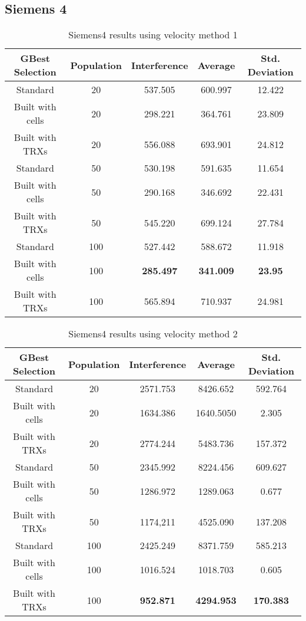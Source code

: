 \subsection{Siemens 4}
\begin{table}[H]
\centering
	\begin{tabular}{| c | c | c | c | c |}
	\hline
	GBest Selection & Population & Interference & Average & Std. Deviation\\ \hline
	Standard & 20 & 537.505 & 600.997 & 12.422\\ \hline
	Built with cells & 20 & 298.221 & 364.761 & 23.809\\ \hline
	Built with TRXs & 20 & 556.088 & 693.901 & 24.812\\ \hline
	Standard & 50 & 530.198 & 591.635 & 11.654\\ \hline
	Built with cells & 50 & 290.168 & 346.692 & 22.431\\ \hline
	Built with TRXs & 50 & 545.220 & 699.124 & 27.784\\ \hline
	Standard & 100 & 527.442 & 588.672 & 11.918\\ \hline
	Built with cells & 100 & \textbf{285.497} & \textbf{341.009} & \textbf{23.95}\\ \hline
	Built with TRXs & 100 & 565.894 & 710.937 & 24.981\\ \hline
	\end{tabular}
\caption{Siemens4 results using velocity method 1}
\label{tab:siem4m1}
\end{table}
\begin{table}[H]
\centering
	\begin{tabular}{| c | c | c | c | c |}
	\hline
	GBest Selection & Population & Interference & Average & Std. Deviation\\ \hline
	Standard & 20 & 2571.753 & 8426.652 & 592.764\\ \hline
	Built with cells & 20 & 1634.386 & 1640.5050 & 2.305\\ \hline
	Built with TRXs & 20 & 2774.244 & 5483.736 & 157.372\\ \hline
	Standard & 50 & 2345.992 & 8224.456 & 609.627\\ \hline
	Built with cells & 50 & 1286.972 & 1289.063 & 0.677\\ \hline
	Built with TRXs & 50 & 1174,211 & 4525.090 & 137.208\\ \hline
	Standard & 100 & 2425.249 & 8371.759 & 585.213\\ \hline
	Built with cells & 100 & 1016.524 & 1018.703 & 0.605\\ \hline
	Built with TRXs & 100 & \textbf{952.871} & \textbf{4294.953} & \textbf{170.383}\\ \hline
	\end{tabular}
\caption{Siemens4 results using velocity method 2}
\label{tab:siem4m2}
\end{table}
